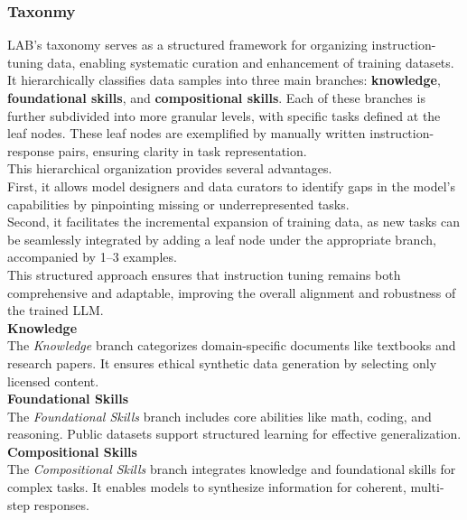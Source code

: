 \documentclass[12pt]{article}
\begin{document}
\subsubsection{Taxonmy}
LAB's taxonomy serves as a structured framework for organizing instruction-tuning data, enabling systematic curation and enhancement of training datasets. It hierarchically classifies data samples into three main branches: \textbf{knowledge}, \textbf{foundational skills}, and \textbf{compositional skills}. Each of these branches is further subdivided into more granular levels, with specific tasks defined at the leaf nodes. These leaf nodes are exemplified by manually written instruction-response pairs, ensuring clarity in task representation.\vspace{14pt}\\
This hierarchical organization provides several advantages.\vspace{14pt}\\
First, it allows model designers and data curators to identify gaps in the model’s capabilities by pinpointing missing or underrepresented tasks.\vspace{14pt}\\
Second, it facilitates the incremental expansion of training data, as new tasks can be seamlessly integrated by adding a leaf node under the appropriate branch, accompanied by 1–3 examples.\vspace{14pt}\\
This structured approach ensures that instruction tuning remains both comprehensive and adaptable, improving the overall alignment and robustness of the trained LLM.\vspace{14pt}\\
\textbf{Knowledge}\\
The \textit{Knowledge} branch categorizes domain-specific documents like textbooks and research papers. It ensures ethical synthetic data generation by selecting only licensed content.\vspace{14pt}\\ 
\textbf{Foundational Skills}\\
The \textit{Foundational Skills} branch includes core abilities like math, coding, and reasoning. Public datasets support structured learning for effective generalization.\vspace{14pt}\\
\textbf{Compositional Skills}\\
The \textit{Compositional Skills} branch integrates knowledge and foundational skills for complex tasks. It enables models to synthesize information for coherent, multi-step responses.
\end{document}
